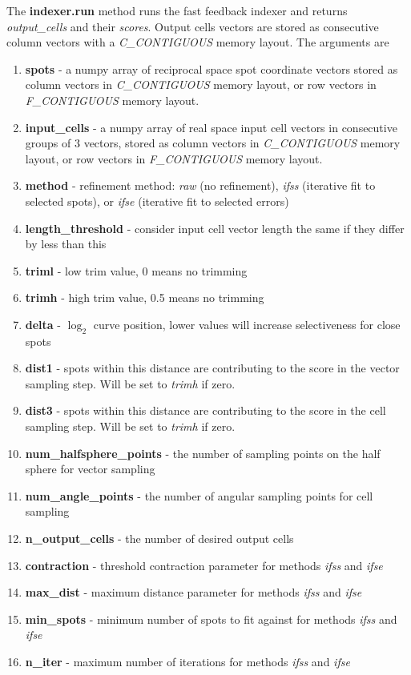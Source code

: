 \documentclass[a4paper,10pt]{article}
\begin{document}
The \textbf{indexer.run} method runs the fast feedback indexer and returns \emph{output\_cells} and their \emph{scores}. Output cells vectors are stored as consecutive column vectors with a \emph{C\_CONTIGUOUS} memory layout. The arguments are
%
\begin{enumerate}
 \item \textbf{spots} - a numpy array of reciprocal space spot coordinate vectors stored as column vectors in \emph{C\_CONTIGUOUS} memory layout, or row vectors in \emph{F\_CONTIGUOUS} memory layout.
 \item \textbf{input\_cells} - a numpy array of real space input cell vectors in consecutive groups of 3 vectors, stored as column vectors in \emph{C\_CONTIGUOUS} memory layout, or row vectors in \emph{F\_CONTIGUOUS} memory layout.
 \item \textbf{method} - refinement method: \emph{raw} (no refinement), \emph{ifss} (iterative fit to selected spots), or \emph{ifse} (iterative fit to selected errors)
 \item \textbf{length\_threshold} - consider input cell vector length the same if they differ by less than this
 \item \textbf{triml} - low trim value, 0 means no trimming
 \item \textbf{trimh} - high trim value, 0.5 means no trimming
 \item \textbf{delta} - $\log_2$ curve position, lower values will increase selectiveness for close spots
 \item \textbf{dist1} - spots within this distance are contributing to the score in the vector sampling step. Will be set to \emph{trimh} if zero.
 \item \textbf{dist3} - spots within this distance are contributing to the score in the cell sampling step. Will be set to \emph{trimh} if zero.
 \item \textbf{num\_halfsphere\_points} - the number of sampling points on the half sphere for vector sampling
 \item \textbf{num\_angle\_points} - the number of angular sampling points for cell sampling
 \item \textbf{n\_output\_cells} - the number of desired output cells
 \item \textbf{contraction} - threshold contraction parameter for methods \emph{ifss} and \emph{ifse}
 \item \textbf{max\_dist} - maximum distance parameter for methods \emph{ifss} and \emph{ifse}
 \item \textbf{min\_spots} - minimum number of spots to fit against for methods \emph{ifss} and \emph{ifse}
 \item \textbf{n\_iter} - maximum number of iterations for methods \emph{ifss} and \emph{ifse}
\end{enumerate}
\end{document}
